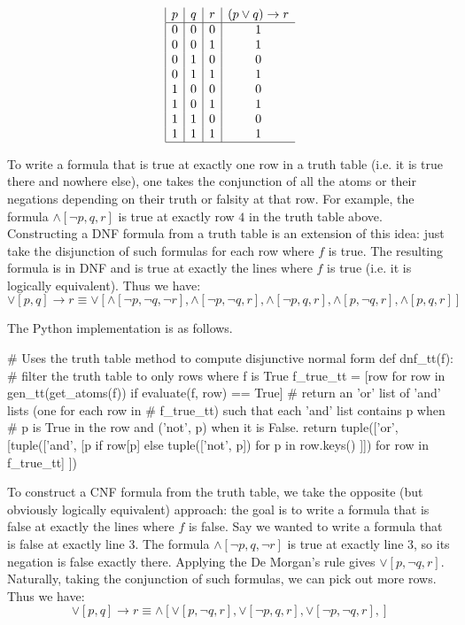 \documentclass[a4paper,notitlepage]{scrartcl}
\begin{document}
\begin{displaymath}
\begin{array}{|c|c|c|c}
   p
 & q
 & r
 & (p\lor{}q)\rightarrow{}r \\
\hline
0 & 0 & 0 & 1 \\
0 & 0 & 1 & 1 \\
0 & 1 & 0 & 0 \\
0 & 1 & 1 & 1 \\
1 & 0 & 0 & 0 \\
1 & 0 & 1 & 1 \\
1 & 1 & 0 & 0 \\
1 & 1 & 1 & 1 \\
\hline
\end{array}
\end{displaymath}

\noindent
To write a formula that is true at exactly one row in a truth table
        (i.e. it is true there and nowhere else), one 
        takes the conjunction of all the atoms or their negations depending
        on their truth or falsity at that row.
For example, the formula $\land [\lnot p, q, r]$ is true at exactly row $4$ in
        the truth table above.
Constructing a DNF formula from a truth table is an extension of this idea:
        just take the disjunction of such formulas for each row where $f$
        is true.
The resulting formula is in DNF and is true at exactly the lines where $f$
        is true (i.e. it is logically equivalent).
Thus we have:
\[
\lor[p,q]\rightarrow r \equiv 
\lor [
\land[\lnot p, \lnot q,\lnot r], 
\land[\lnot p,\lnot q,r], 
\land[\lnot p,q,r], 
\land[p,\lnot q,r], 
\land[p,q,r]
     ]
\]

The Python implementation is as follows.

\begin{code}
# Uses the truth table method to compute disjunctive normal form
def dnf_tt(f):
    # filter the truth table to only rows where f is True
    f_true_tt = [row for row in gen_tt(get_atoms(f)) 
                 if evaluate(f, row) == True]
    # return an 'or' list of 'and' lists (one for each row in
    # f_true_tt) such that each 'and' list contains p when
    # p is True in the row and ('not', p) when it is False.
    return tuple(['or', [tuple(['and', 
        [p if row[p] else tuple(['not', p]) for p in row.keys() ]]) 
        for row in f_true_tt] ])
\end{code}

To construct a CNF formula from the truth table, we take the opposite (but
	obviously
        logically equivalent) approach: the goal is to write a formula
        that is false at exactly the lines where $f$ is false. 
Say we wanted to write a formula that is false at exactly line $3$.
The formula $\land[\lnot p, q, \lnot r]$ is true at exactly line $3$, so its
        negation is false exactly there.
Applying the De Morgan's rule gives $\lor[p, \lnot q, r]$.
Naturally, taking the conjunction of such formulas, we can pick out more rows.
Thus we have:
\[
\lor[p,q]\rightarrow r \equiv 
\land[
\lor[p, \lnot q, r], 
\lor[\lnot p, q, r], 
\lor[\lnot p, \lnot q, r], 
     ]
\]
\end{document}
